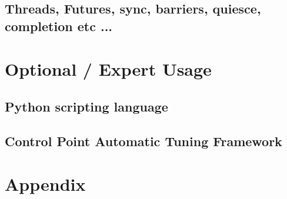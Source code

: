 \documentclass[10pt]{report}
\begin{document}
\chapter{Threads, Futures, sync, barriers, quiesce, completion etc ...}
  
  

      
      
%  


\part{Optional / Expert Usage}

\chapter{Python scripting language}
\label{python}
  

\chapter{Control Point Automatic Tuning Framework}
\label{sec:controlpoint}
  

%

\part{Appendix}
\appendix


%






\end{document}
